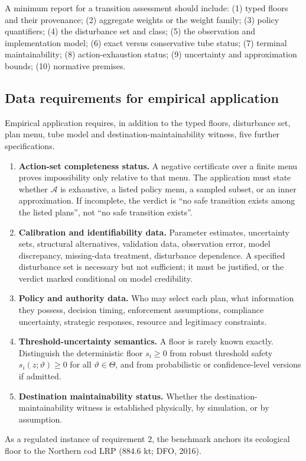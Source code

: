 \documentclass[preprint,11pt,authoryear]{elsarticle}
\theoremstyle{remark}
\begin{document}
A minimum report for a transition assessment should include: (1) typed floors and their provenance; (2) aggregate weights or the weight family; (3) policy quantifiers; (4) the disturbance set and class; (5) the observation and implementation model; (6) exact versus conservative tube status; (7) terminal maintainability; (8) action-exhaustion status; (9) uncertainty and approximation bounds; (10) normative premises.

\subsection{Data requirements for empirical application}

Empirical application requires, in addition to the typed floors, disturbance set, plan menu, tube model and destination-maintainability witness, five further specifications.
\begin{enumerate}[leftmargin=2em]
\item \textbf{Action-set completeness status.} A negative certificate over a finite menu proves impossibility only relative to that menu. The application must state whether $\mathcal A$ is exhaustive, a listed policy menu, a sampled subset, or an inner approximation. If incomplete, the verdict is ``no safe transition exists among the listed plans'', not ``no safe transition exists''.
\item \textbf{Calibration and identifiability data.} Parameter estimates, uncertainty sets, structural alternatives, validation data, observation error, model discrepancy, missing-data treatment, disturbance dependence. A specified disturbance set is necessary but not sufficient; it must be justified, or the verdict marked conditional on model credibility.
\item \textbf{Policy and authority data.} Who may select each plan, what information they possess, decision timing, enforcement assumptions, compliance uncertainty, strategic responses, resource and legitimacy constraints.
\item \textbf{Threshold-uncertainty semantics.} A floor is rarely known exactly. Distinguish the deterministic floor $s_i\ge0$ from robust threshold safety $s_i(z;\vartheta)\ge0$ for all $\vartheta\in\Theta$, and from probabilistic or confidence-level versions if admitted.
\item \textbf{Destination maintainability status.} Whether the destination-maintainability witness is established physically, by simulation, or by assumption.
\end{enumerate}
As a regulated instance of requirement 2, the benchmark anchors its ecological floor to the Northern cod LRP ($884.6$ kt; DFO, 2016).
\end{document}
